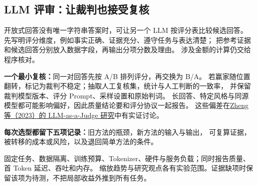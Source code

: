\subsection{LLM 评审：让裁判也接受复核}
\label{concept:llm-judge}

开放式回答没有唯一字符串答案时，可让另一个 LLM 按评分表比较候选回答。
先写明评分维度，例如事实正确、证据充分、遵守任务与表达清楚；
把参考证据和候选回答分别放入数据字段，再输出分项分数及理由。
涉及金额的计算仍交给程序核对。

\textbf{一个最小复核：}同一对回答先按 A/B 排列评分，再交换为 B/A。
若赢家随位置翻转，标记为裁判不稳定；抽取人工复核集，统计与人工判断的一致率，
并保留裁判模型版本、评分 Prompt、采样设置和原始判词。
长回答、特定风格与同源模型都可能影响偏好，因此质量结论要和评分协议一起报告。
这些偏差在\href{https://arxiv.org/abs/2306.05685}{Zheng 等（2023）的 LLM-as-a-Judge 研究}中有实证讨论。

\textbf{每次选型都留下五项记录：}旧方法的瓶颈，新方法的输入与输出，
可复算证据，被转移的成本或风险，以及退回简单方法的条件。

\begin{boundarybox}[title={适用条件：本章比较共用的一把尺}]
固定任务、数据隔离、训练预算、Tokenizer、硬件与服务负载；同时报告质量、首 Token 延迟、吞吐和内存。
缩放趋势与研究观点各有实验范围。证据缺项时保留该项为待测，不把局部收益外推到所有任务。
\end{boundarybox}

\label{route:standard-end}
